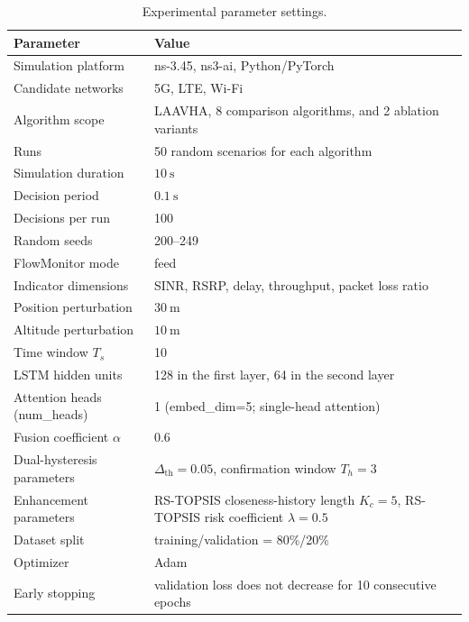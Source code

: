 \documentclass[10pt,a4paper]{article}
\begin{document}
\begin{table}[H]
\centering
\caption{Experimental parameter settings.}
\small
\begin{tabular}{>{\raggedright\arraybackslash}p{3.2cm}p{8.5cm}}
\toprule
Parameter & Value \\
\midrule
Simulation platform & ns-3.45, ns3-ai, Python/PyTorch \\
Candidate networks & 5G, LTE, Wi-Fi \\
Algorithm scope & LAAVHA, 8 comparison algorithms, and 2 ablation variants \\
Runs & 50 random scenarios for each algorithm \\
Simulation duration & $10~\mathrm{s}$ \\
Decision period & $0.1~\mathrm{s}$ \\
Decisions per run & 100 \\
Random seeds & 200--249\\
FlowMonitor mode & feed \\
Indicator dimensions & SINR, RSRP, delay, throughput, packet loss ratio \\
Position perturbation & $30~\mathrm{m}$ \\
Altitude perturbation & $10~\mathrm{m}$ \\
Time window $T_s$ & 10 \\
LSTM hidden units & 128 in the first layer, 64 in the second layer \\
Attention heads (num\_heads) & 1 (embed\_dim=5; single-head attention) \\
Fusion coefficient $\alpha$ & 0.6 \\
Dual-hysteresis parameters & $\Delta_{\mathrm{th}}=0.05$, confirmation window $T_h=3$ \\
Enhancement parameters & RS-TOPSIS closeness-history length $K_c=5$, RS-TOPSIS risk coefficient $\lambda=0.5$ \\
Dataset split & training/validation = 80\%/20\% \\
Optimizer & Adam \\
Early stopping & validation loss does not decrease for 10 consecutive epochs \\
\bottomrule
\end{tabular}
\label{tab:params}
\end{table}
\end{document}
